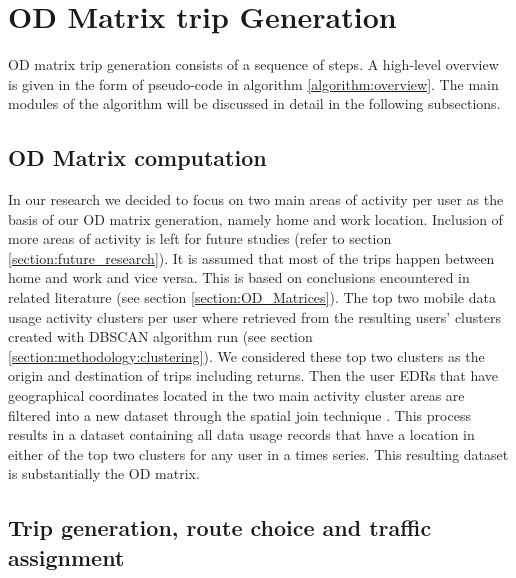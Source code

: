 \documentclass[12pt, a4paper]{report}
\theoremstyle{definition}
\theoremstyle{definition}%
\theoremstyle{definition}%
\theoremstyle{definition}%
\theoremstyle{definition}%
\theoremstyle{definition}%
\begin{document}


\section{OD Matrix trip Generation}  \label{section:odmatrix_trip_generation}

OD matrix trip generation consists of a sequence of steps. A high-level overview is given in the form of pseudo-code in algorithm \ref{algorithm:overview}. The main modules of the algorithm will be discussed in detail in the following subsections.
 
\subsection{OD Matrix computation}   \label{subsection:odmatrix_computation}
In our research we decided to focus on two main areas of activity per user as the basis of our OD matrix generation, namely home and work location. Inclusion of more areas of activity is left for future studies (refer to section \ref{section:future_research}). It is assumed that most of the trips happen between home and work and vice versa. This is based on conclusions encountered in related literature (see section \ref{section:OD_Matrices}). 
The top two mobile data usage activity clusters per user where retrieved from the resulting users' clusters created with DBSCAN algorithm run (see section \ref{section:methodology:clustering}). We considered these top two clusters as the origin and destination of trips including returns. Then the user EDRs that have geographical coordinates located in the two main activity cluster areas are filtered into a new dataset through the spatial join technique \cite{eldawy2015spatialhadoop}. This process results in a dataset containing all data usage records that have a location in either of the top two clusters for any user in a times series. This resulting dataset is substantially the OD matrix.


\subsection{Trip generation, route choice and traffic assignment} \label{subsection:trip_generation}
\end{document}
